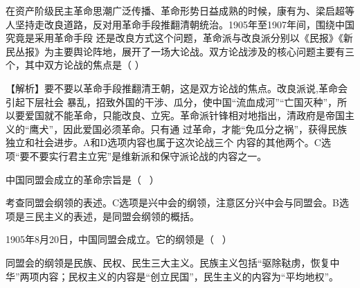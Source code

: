 \question 在资产阶级民主革命思潮广泛传播、革命形势日益成熟的时候，康有为、梁启超等人坚持走改良道路，反对用革命手段推翻清朝统治。1905年至1907年间，围绕中国究竟是采用革命手段
还是改良方式这个问题，革命派与改良派分别以《民报》《新民丛报》为主要舆论阵地，展开了一场大论战。双方论战涉及的核心问题主要有三个，其中双方论战的焦点是（
）
\par{}
\begin{solution}【解析】要不要以革命手段推翻清王朝，这是双方论战的焦点。改良派说,革命会引起下层社会
暴乱，招致外国的干涉、瓜分，使中国``流血成河''``亡国灭种''，所以要爱国就不能革命，只能改良、立宪。革命派针锋相对地指出，清政府是帝国主义的``鹰犬''，因此爱国必须革命。只有通
过革命，才能``免瓜分之祸''，获得民族独立和社会进步。A和D选项内容也属于这次论战三个
内容的其他两个。C选项``要不要实行君主立宪''是维新派和保守派论战的内容之一。
\end{solution}
\question 中国同盟会成立的革命宗旨是（ ~）
\par{}
\begin{solution}考查同盟会纲领的表述。C选项是兴中会的纲领，注意区分兴中会与同盟会。B选项是三民主义的表述，是同盟会纲领的概括。
\end{solution}
\question 1905年8月20日，中国同盟会成立。它的纲领是（ ~）
\par{}
\begin{solution}同盟会的纲领是民族、民权、民生三大主义。民族主义包括``驱除鞑虏，恢复中华''两项内容；民权主义的内容是``创立民国''，民生主义的内容为``平均地权''。
\end{solution}

